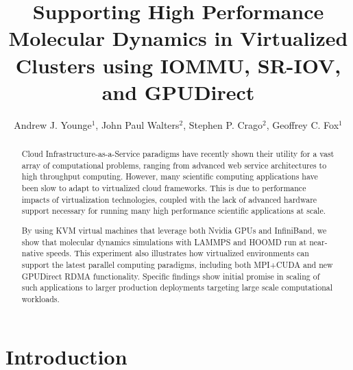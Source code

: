 \documentclass[10pt]{sigplanconf}
\title{Supporting High Performance Molecular Dynamics in Virtualized Clusters using IOMMU, SR-IOV, and GPUDirect}
\subtitle{\large{Andrew J. Younge$^1$, John Paul Walters$^2$, Stephen P. Crago$^2$, Geoffrey C. Fox$^1$}}
\begin{document}
\maketitle
\begin{abstract}

Cloud Infrastructure-as-a-Service paradigms have recently shown their utility for a vast array of computational problems, ranging from advanced web service architectures to high throughput computing.  However, many scientific computing applications have been slow to adapt to virtualized cloud frameworks. This is due to performance impacts of virtualization technologies, coupled with the lack of advanced hardware support necessary for running many high performance scientific applications at scale. 

By using KVM virtual machines that leverage both Nvidia GPUs and InfiniBand, we show that molecular dynamics simulations with LAMMPS and HOOMD run at near-native speeds. This experiment also illustrates how virtualized environments can support the latest parallel computing paradigms, including both MPI+CUDA and new GPUDirect RDMA functionality. Specific findings show initial promise in scaling of such applications to larger production deployments targeting large scale computational workloads.  


 



\end{abstract}

\section{Introduction}
\end{document}
